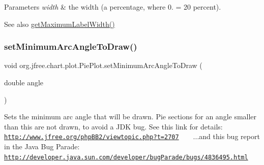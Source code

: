 \begin{DoxyParams}{Parameters}
{\em width} & the width (a percentage, where 0. = 20 percent).\\
\hline
\end{DoxyParams}
\begin{DoxySeeAlso}{See also}
\mbox{\hyperlink{classorg_1_1jfree_1_1chart_1_1plot_1_1_pie_plot_a07464db0f32860f10894704d8134fa8b}{get\+Maximum\+Label\+Width()}} 
\end{DoxySeeAlso}
\mbox{\label{classorg_1_1jfree_1_1chart_1_1plot_1_1_pie_plot_a1092c8623f27b65bb09368904b96ff4b}} 
\subsubsection{\texorpdfstring{set\+Minimum\+Arc\+Angle\+To\+Draw()}{setMinimumArcAngleToDraw()}}
{\footnotesize\ttfamily void org.\+jfree.\+chart.\+plot.\+Pie\+Plot.\+set\+Minimum\+Arc\+Angle\+To\+Draw (\begin{DoxyParamCaption}\item[{double}]{angle }\end{DoxyParamCaption})}

Sets the minimum arc angle that will be drawn. Pie sections for an angle smaller than this are not drawn, to avoid a J\+DK bug. See this link for details\+: ~\newline
~\newline
 \href{http://www.jfree.org/phpBB2/viewtopic.php?t=2707}{\tt http\+://www.\+jfree.\+org/php\+B\+B2/viewtopic.\+php?t=2707} ~\newline
~\newline
 ...and this bug report in the Java Bug Parade\+: ~\newline
~\newline
 \href{http://developer.java.sun.com/developer/bugParade/bugs/4836495.html}{\tt http\+://developer.\+java.\+sun.\+com/developer/bug\+Parade/bugs/4836495.\+html}


